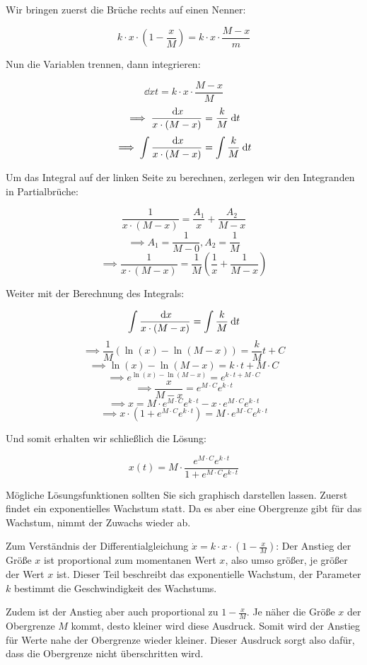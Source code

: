 \item Wir bringen zuerst die Brüche rechts auf einen Nenner:

$$k \cdot x \cdot (1-\frac{x}{M}) = k \cdot x \cdot \frac{M-x}{m}$$

Nun die Variablen trennen, dann integrieren:

$$\dd{x}{t} = k \cdot x \cdot \frac{M-x}{M}$$
$$\implies \frac{\:\mathrm{d}{x}}{x\cdot(M-x)} = \frac{k}{M} \:\mathrm{d}{t}$$
$$\implies \int \frac{\:\mathrm{d}{x}}{x\cdot(M-x)} = \int \frac{k}{M} \:\mathrm{d}{t}$$

Um das Integral auf der linken Seite zu berechnen, zerlegen wir den Integranden in Partialbrüche:

$$\frac{1}{x\cdot(M-x)} = \frac{A_1}{x} + \frac{A_2}{M-x}$$
$$\implies A_1 = \frac{1}{M-0}, A_2 = \frac{1}{M}$$
$$\implies \frac{1}{x\cdot(M-x)} = \frac{1}{M} \left(\frac{1}{x} + \frac{1}{M-x}\right)$$

Weiter mit der Berechnung des Integrals:

$$\int \frac{\:\mathrm{d}{x}}{x\cdot(M-x)} = \int \frac{k}{M} \:\mathrm{d}{t}$$
$$\implies \frac{1}{M}(\ln(x)-\ln(M-x)) = \frac{k}{M}t + C$$
$$\implies \ln(x)-\ln(M-x) = k\cdot t + M\cdot C$$
$$\implies e^{\ln(x)-\ln(M-x)} = e^{k\cdot t + M\cdot C}$$
$$\implies \frac{x}{M-x} = e^{M\cdot C} e^{k\cdot t}$$
$$\implies x = M \cdot e^{M\cdot C} e^{k\cdot t} - x \cdot e^{M\cdot C} e^{k\cdot t}$$
$$\implies x\cdot\left(1+e^{M\cdot C} e^{k\cdot t}\right) = M \cdot e^{M\cdot C} e^{k\cdot t}$$

Und somit erhalten wir schließlich die Lösung:

$$x(t) = M \cdot \frac{e^{M\cdot C} e^{k\cdot t}}{1+e^{M\cdot C} e^{k\cdot t}}$$

Mögliche Lösungsfunktionen sollten Sie sich graphisch darstellen lassen. Zuerst findet ein exponentielles Wachstum statt. Da es aber eine Obergrenze gibt für das Wachstum, nimmt der Zuwachs wieder ab.

Zum Verständnis der Differentialgleichung $\dot x= k \cdot x \cdot (1-\frac{x}{M})$: Der Anstieg der Größe $x$ ist proportional zum momentanen Wert $x$, also umso größer, je größer der Wert $x$ ist. Dieser Teil beschreibt das exponentielle Wachstum, der Parameter $k$ bestimmt die Geschwindigkeit des Wachstums.

Zudem ist der Anstieg aber auch proportional zu $1-\frac{x}{M}$. Je näher die Größe $x$ der Obergrenze $M$ kommt, desto kleiner wird diese Ausdruck. Somit wird der Anstieg für Werte nahe der Obergrenze wieder kleiner. Dieser Ausdruck sorgt also dafür, dass die Obergrenze nicht überschritten wird.

